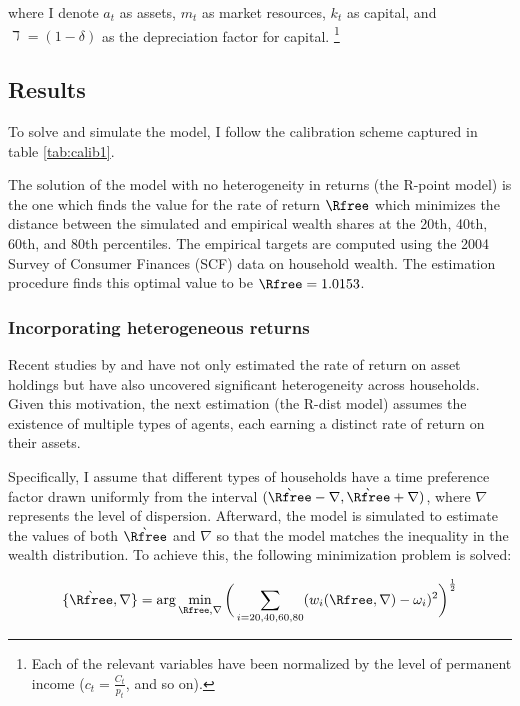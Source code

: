 \documentclass[\econtexRoot/Chp1proposal]{subfiles}
\begin{document}
where I denote $a_t$ as assets, $m_t$ as market resources, $k_t$ as capital, and $\daleth = (1 - \delta)$ as the depreciation factor for capital. \footnote{Each of the relevant variables have been normalized by the level of permanent income ($c_t = \frac{C_t}{p_t}$, and so on).}

\subsection{Results}
\par To solve and simulate the model, I follow the calibration scheme captured in table \ref{tab:calib1}.
\unskip

\par The solution of the model with no heterogeneity in returns (the R-point model) is the one which finds the value for the rate of return $\Rfree$ which minimizes the distance between the simulated and empirical wealth shares at the 20th, 40th, 60th, and 80th percentiles. The empirical targets are computed using the 2004 Survey of Consumer Finances (SCF) data on household wealth. The estimation procedure finds this optimal value to be $\Rfree = 1.0153$.

\subsubsection{Incorporating heterogeneous returns}

\par Recent studies by \cite{aflgdmlp20} and \cite{lblcps18} have not only estimated the rate of return on asset holdings but have also uncovered significant heterogeneity across households. Given this motivation, the next estimation (the R-dist model) assumes the existence of multiple types of agents, each earning a distinct rate of return on their assets.

\par Specifically, I assume that different types of households have a time preference factor drawn uniformly from the interval $(\grave{\Rfree} - \nabla, \grave{\Rfree} + \nabla)$, where $\nabla$ represents the level of dispersion. Afterward, the model is simulated to estimate the values of both $\grave{\Rfree}$ and $\nabla$ so that the model matches the inequality in the wealth distribution. To achieve this, the following minimization problem is solved:

$$ \{\grave{\Rfree}, \nabla\} = \text{arg}\min_{\Rfree, \nabla} \bigg( \sum_{i=20, 40, 60, 80} (w_{i}(\Rfree, \nabla)-\omega_i )^{2} \bigg)^{\frac{1}{2}} $$
\end{document}
